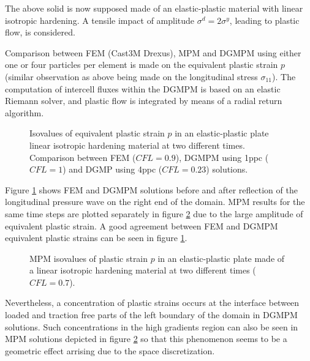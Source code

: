 The above solid is now supposed made of an elastic-plastic material with linear isotropic hardening. A tensile impact of amplitude $\sigma^d=2\sigma^y$, leading to plastic flow, is considered. 

Comparison between FEM (Cast3M Drexus), MPM and DGMPM using either one or four particles per element is made on the equivalent plastic strain $p$ (similar observation as above being made on the longitudinal stress $\sigma_{11}$).
The computation of intercell fluxes within the DGMPM is based on an elastic Riemann solver, and plastic flow is integrated by means of a radial return algorithm.
\begin{figure}[h!]
  \centering
  
  \caption{Isovalues of equivalent plastic strain $p$ in an elastic-plastic plate linear isotropic hardening material at two different times. Comparison between FEM ($CFL=0.9$), DGMPM using 1ppc ($CFL=1$) and DGMP using 4ppc ($CFL=0.23$) solutions.}
  \label{fig:2dEP_comparison}
\end{figure}
Figure \ref{fig:2dEP_comparison} shows FEM and DGMPM solutions before and after reflection of the longitudinal pressure wave on the right end of the domain. MPM results for the same time steps are plotted separately in figure \ref{fig:2dEP_mpm} due to the large amplitude of equivalent plastic strain. A good agreement between FEM and DGMPM equivalent plastic strains can be seen in figure \ref{fig:2dEP_comparison}. 

\begin{figure}[h!]
  \centering
  
  \caption{MPM isovalues of plastic strain $p$ in an elastic-plastic plate made of a linear isotropic hardening material at two different times ($CFL=0.7$).}
  \label{fig:2dEP_mpm}
\end{figure}
Nevertheless, a concentration of plastic strains occurs at the interface between loaded and traction free parts of the left boundary of the domain in DGMPM solutions. 
Such concentrations in the high gradients region can also be seen in MPM solutions depicted in figure \ref{fig:2dEP_mpm} so that this phenomenon seems to be a geometric effect arrising due to the space discretization.

